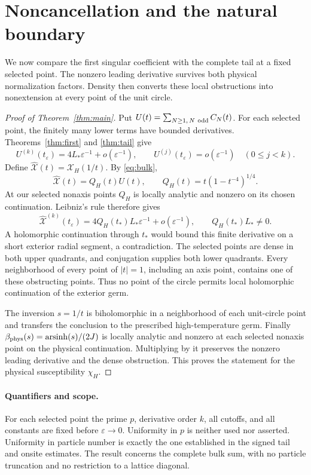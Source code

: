 \documentclass[11pt]{article}
\numberwithin{equation}{section}
\theoremstyle{definition}
\newcommand{\eps}{\varepsilon}
\begin{document}
\section{Noncancellation and the natural boundary}

We now compare the first singular coefficient with the complete tail
at a fixed selected point. The nonzero leading derivative survives both
physical normalization factors. Density then converts these local
obstructions into nonextension at every point of the unit circle.
\begin{proof}[Proof of Theorem~\ref{thm:main}]
Put $U(t)=\sum_{N\ge1,\,N\ {\rm odd}}C_N(t)$. For each selected
point, the finitely many lower terms have bounded derivatives.
Theorems~\ref{thm:first} and \ref{thm:tail} give
\[
 U^{(k)}(t_\eps)=4L_*\eps^{-1}+o(\eps^{-1}),
 \qquad U^{(j)}(t_\eps)=o(\eps^{-1})\quad(0\le j<k).
\]
Define $\widehat{\mathcal X}(t)=\mathcal X_H(1/t)$.
By \eqref{eq:bulk},
\[
 \widehat{\mathcal X}(t)=Q_H(t)U(t),\qquad
 Q_H(t)=t(1-t^{-4})^{1/4}.
\]
At our selected nonaxis points $Q_H$ is locally analytic and
nonzero on its chosen continuation. Leibniz's rule therefore gives
\[
 \widehat{\mathcal X}^{(k)}(t_\eps)
 =4Q_H(t_*)L_*\eps^{-1}+o(\eps^{-1}),
 \qquad Q_H(t_*)L_*\ne0.
\]
A holomorphic continuation through $t_*$ would bound this finite
derivative on a short exterior radial segment, a contradiction.
The selected points are dense in both upper quadrants, and
conjugation supplies both lower quadrants. Every neighborhood of
every point of $|t|=1$, including an axis point, contains one of
these obstructing points. Thus no point of the circle permits
local holomorphic continuation of the exterior germ.

The inversion $s=1/t$ is biholomorphic in a neighborhood of each
unit-circle point and transfers the conclusion to the prescribed
high-temperature germ. Finally
$\beta_{\rm phys}(s)=\operatorname{arsinh}(s)/(2J)$ is locally
analytic and nonzero at each selected nonaxis point on the
physical continuation. Multiplying by it preserves the nonzero
leading derivative and the dense obstruction. This proves the
statement for the physical susceptibility $\chi_H$.
\end{proof}

\paragraph{Quantifiers and scope.}
For each selected point the prime $p$, derivative order $k$, all
cutoffs, and all constants are fixed before $\eps\to0$. Uniformity
in $p$ is neither used nor asserted. Uniformity in particle number
is exactly the one established in the signed tail and onsite
estimates. The result concerns the complete bulk sum, with no
particle truncation and no restriction to a lattice diagonal.
\end{document}
